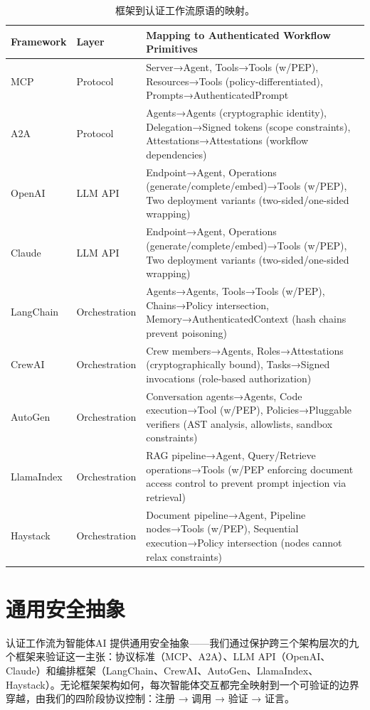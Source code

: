 
\begin{table}[t!]
\centering
\scriptsize
\begin{tabular}{llp{11cm}}
\toprule
\textbf{Framework} & \textbf{Layer} & \textbf{Mapping to Authenticated Workflow Primitives} \\
\midrule
MCP & Protocol & Server→Agent, Tools→Tools (w/PEP), Resources→Tools (policy-differentiated), Prompts→AuthenticatedPrompt \\
A2A & Protocol & Agents→Agents (cryptographic identity), Delegation→Signed tokens (scope constraints), Attestations→Attestations (workflow dependencies) \\
OpenAI & LLM API & Endpoint→Agent, Operations (generate/complete/embed)→Tools (w/PEP), Two deployment variants (two-sided/one-sided wrapping) \\
Claude & LLM API & Endpoint→Agent, Operations (generate/complete/embed)→Tools (w/PEP), Two deployment variants (two-sided/one-sided wrapping) \\
LangChain & Orchestration & Agents→Agents, Tools→Tools (w/PEP), Chains→Policy intersection, Memory→AuthenticatedContext (hash chains prevent poisoning) \\
CrewAI & Orchestration & Crew members→Agents, Roles→Attestations (cryptographically bound), Tasks→Signed invocations (role-based authorization) \\
AutoGen & Orchestration & Conversation agents→Agents, Code execution→Tool (w/PEP), Policies→Pluggable verifiers (AST analysis, allowlists, sandbox constraints) \\
LlamaIndex & Orchestration & RAG pipeline→Agent, Query/Retrieve operations→Tools (w/PEP enforcing document access control to prevent prompt injection via retrieval) \\
Haystack & Orchestration & Document pipeline→Agent, Pipeline nodes→Tools (w/PEP), Sequential execution→Policy intersection (nodes cannot relax constraints) \\
\bottomrule
\end{tabular}
\caption{框架到认证工作流原语的映射。}
\label{tab:framework-mapping}
\end{table}

\section{通用安全抽象}
\label{sec:enforcement}


认证工作流为智能体{}AI 提供通用安全抽象——我们通过保护跨三个架构层次的九个框架来验证这一主张：协议标准（MCP、A2A）、LLM API（OpenAI、Claude）和编排框架（LangChain、CrewAI、AutoGen、LlamaIndex、Haystack）。无论框架架构如何，每次智能体交互都完全映射到一个可验证的边界穿越，由我们的四阶段协议控制：注册 → 调用 → 验证 → 证言。

